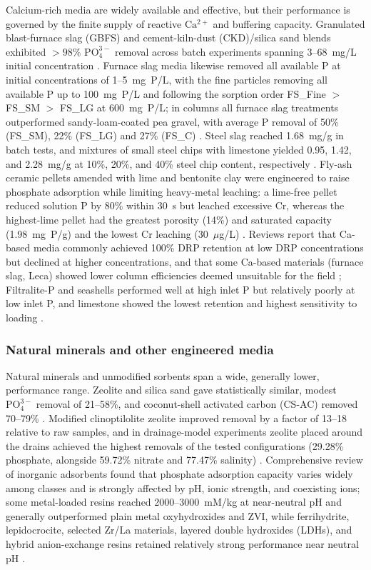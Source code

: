 Calcium-rich media are widely available and effective, but their performance is
governed by the finite supply of reactive $\mathrm{Ca^{2+}}$ and buffering
capacity. Granulated blast-furnace slag (GBFS) and cement-kiln-dust (CKD)/silica
sand blends exhibited $>98\%$ $\mathrm{PO_4^{3-}}$ removal across batch experiments
spanning 3--68~mg/L initial concentration \parencite{Agrawal2011}. Furnace slag
media likewise removed all available P at initial concentrations of 1--5~mg~P/L,
with the fine particles removing all available P up to 100~mg~P/L and following
the sorption order FS\_Fine $>$ FS\_SM $>$ FS\_LG at 600~mg~P/L; in columns all
furnace slag treatments outperformed sandy-loam-coated pea gravel, with average
P removal of 50\% (FS\_SM), 22\% (FS\_LG) and 27\% (FS\_C) \parencite{Sanford2016}.
Steel slag reached 1.68~mg/g in batch tests, and mixtures of small steel chips
with limestone yielded 0.95, 1.42, and 2.28~mg/g at 10\%, 20\%, and 40\% steel
chip content, respectively \parencite{Sellner2019b}. Fly-ash ceramic pellets
amended with lime and bentonite clay were engineered to raise phosphate
adsorption while limiting heavy-metal leaching: a lime-free pellet reduced
solution P by 80\% within 30~s but leached excessive Cr, whereas the highest-lime
pellet had the greatest porosity (14\%) and saturated capacity (1.98~mg~P/g) and
the lowest Cr leaching (30~$\mu$g/L) \parencite{Li2017}. Reviews report that
Ca-based media commonly achieved 100\% DRP retention at low DRP concentrations but
declined at higher concentrations, and that some Ca-based materials (furnace slag,
Leca) showed lower column efficiencies deemed unsuitable for the field
\parencite{Mendes2022}; Filtralite-P and seashells performed well at high inlet P
but relatively poorly at low inlet P, and limestone showed the lowest retention
and highest sensitivity to loading \parencite{Pugliese2023}.

\subsubsection{Natural minerals and other engineered media}

Natural minerals and unmodified sorbents span a wide, generally lower,
performance range. Zeolite and silica sand gave statistically similar, modest
$\mathrm{PO_4^{3-}}$ removal of 21--58\%, and coconut-shell activated carbon
(CS-AC) removed 70--79\% \parencite{Agrawal2011}. Modified clinoptilolite zeolite
improved removal by a factor of 13--18 relative to raw samples, and in
drainage-model experiments zeolite placed around the drains achieved the highest
removals of the tested configurations (29.28\% phosphate, alongside 59.72\%
nitrate and 77.47\% salinity) \parencite{Sadeghi2021}. Comprehensive review of
inorganic adsorbents found that phosphate adsorption capacity varies widely among
classes and is strongly affected by pH, ionic strength, and coexisting ions; some
metal-loaded resins reached 2000--3000~mM/kg at near-neutral pH and generally
outperformed plain metal oxyhydroxides and ZVI, while ferrihydrite,
lepidocrocite, selected Zr/La materials, layered double hydroxides (LDHs), and
hybrid anion-exchange resins retained relatively strong performance near neutral
pH \parencite{Li2020}.

